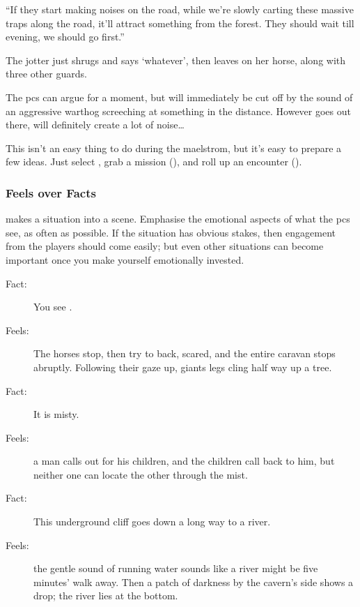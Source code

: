 \begin{multicols}{2}
\begin{boxtext}
  ``If they start making noises on the road, while we're slowly carting these massive traps along the road, it'll attract something from the forest.
  They should wait till evening, we should go first.''

  The \gls{jotter} just shrugs and says `whatever', then leaves on her horse, along with three other \glspl{guard}.
\end{boxtext}

The \glspl{pc} can argue for a moment, but will immediately be cut off by the sound of an aggressive warthog screeching at something in the distance.
However goes out there, will definitely create a lot of noise\ldots

\bigLine

This isn't an easy thing to do during the maelstrom, but it's easy to prepare a few ideas.
Just select , grab a mission (), and roll up an encounter ().

\subsubsection{Feels over Facts}
makes a situation into a scene.
Emphasise the emotional aspects of what the \glspl{pc} see, as often as possible.
If the situation has obvious stakes, then engagement from the players should come easily; but even other situations can become important once you make yourself emotionally invested.

\begin{description}
  \item[Fact:] You see .
  \item[\quad Feels:] The horses stop, then try to back, scared, and the entire caravan stops abruptly.
  Following their gaze up, giants legs cling half way up a tree.
  \item[Fact:] It is misty.
  \item[\quad Feels:] a man calls out for his children, and the children call back to him, but neither one can locate the other through the mist.
  \item[Fact:] This underground cliff goes down a long way to a river.
  \item[\quad Feels:] the gentle sound of running water sounds like a river might be five minutes' walk away.
  Then a patch of darkness by the cavern's side shows a drop; the river lies at the bottom.
\end{description}


\end{multicols}
